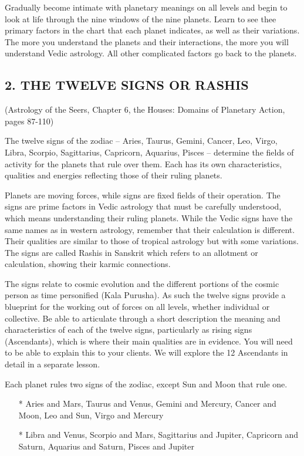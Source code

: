 Gradually become intimate with planetary meanings on all levels and begin to look at life through the nine windows of the nine planets. Learn to see thee primary factors in the chart that each planet indicates, as well as their variations. The more you understand the planets and their interactions, the more you will understand Vedic astrology. All other complicated factors go back to the planets.

 

\subsection{2. THE TWELVE SIGNS OR RASHIS} (Astrology of the Seers, Chapter 6, the Houses: Domains of Planetary Action, pages 87-110)
 

The twelve signs of the zodiac – Aries, Taurus, Gemini, Cancer, Leo, Virgo, Libra, Scorpio, Sagittarius, Capricorn, Aquarius, Pisces – determine the fields of activity for the planets that rule over them. Each has its own characteristics, qualities and energies reflecting those of their ruling planets.

 

Planets are moving forces, while signs are fixed fields of their operation. The signs are prime factors in Vedic astrology that must be carefully understood, which means understanding their ruling planets. While the Vedic signs have the same names as in western astrology, remember that their calculation is different. Their qualities are similar to those of tropical astrology but with some variations. The signs are called Rashis in Sanskrit which refers to an allotment or calculation, showing their karmic connections.

 

The signs relate to cosmic evolution and the different portions of the cosmic person as time personified (Kala Purusha). As such the twelve signs provide a blueprint for the working out of forces on all levels, whether individual or collective. Be able to articulate through a short description the meaning and characteristics of each of the twelve signs, particularly as rising signs (Ascendants), which is where their main qualities are in evidence. You will need to be able to explain this to your clients. We will explore the 12 Ascendants  in detail in a separate lesson.

 

Each planet rules two signs of the zodiac, except Sun and Moon that rule one.


\begin{enumerate}
\item[*] Aries and Mars, Taurus and Venus, Gemini and Mercury, Cancer and Moon, Leo and Sun, Virgo and Mercury
\item[*] Libra and Venus, Scorpio and Mars, Sagittarius and Jupiter, Capricorn and Saturn, Aquarius and Saturn, Pisces and Jupiter
 \end{enumerate}

